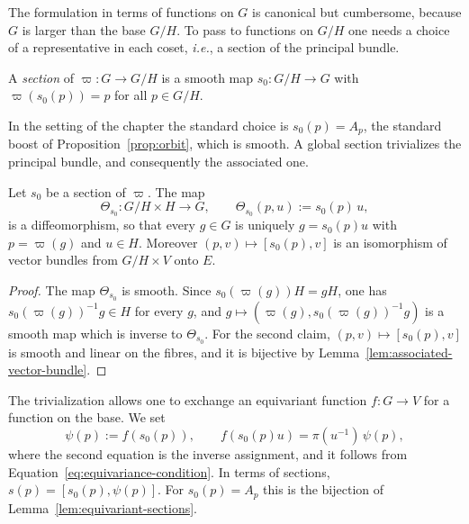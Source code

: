 	The formulation in terms of functions on $G$ is canonical but cumbersome, because $G$ is larger than the base $G/H$. To pass to functions on $G/H$ one needs a choice of a representative in each coset, \textit{i.e.}, a section of the principal bundle.
	
	\begin{definition}\label{def:section-principal}
		A \emph{section} of $\varpi:G\to G/H$ is a smooth map $s_0:G/H\to G$ with $\varpi(s_0(p))=p$ for all $p\in G/H$.
	\end{definition}
	
	In the setting of the chapter the standard choice is $s_0(p)=A_p$, the standard boost of Proposition~\ref{prop:orbit}, which is smooth. A global section trivializes the principal bundle, and consequently the associated one.
	
	\begin{lemma}\label{lem:trivialization}
		Let $s_0$ be a section of $\varpi$. The map
		\begin{equation}\label{eq:trivialization}
			\Theta_{s_0}:G/H\times H\to G,\qquad \Theta_{s_0}(p,u):=s_0(p)\,u,
		\end{equation}
		is a diffeomorphism, so that every $g\in G$ is uniquely $g=s_0(p)u$ with $p=\varpi(g)$ and $u\in H$. Moreover $(p,v)\mapsto[s_0(p),v]$ is an isomorphism of vector bundles from $G/H\times V$ onto $E$.
	\end{lemma}
	
	\begin{proof}
		The map $\Theta_{s_0}$ is smooth. Since $s_0(\varpi(g))H=gH$, one has $s_0(\varpi(g))^{-1}g\in H$ for every $g$, and $g\mapsto(\varpi(g),s_0(\varpi(g))^{-1}g)$ is a smooth map which is inverse to $\Theta_{s_0}$. For the second claim, $(p,v)\mapsto[s_0(p),v]$ is smooth and linear on the fibres, and it is bijective by Lemma~\ref{lem:associated-vector-bundle}.
	\end{proof}
	
	The trivialization allows one to exchange an equivariant function $f:G\to V$ for a function on the base. We set
	\begin{equation}\label{eq:psi-definition}
		\psi(p):=f(s_0(p)),\qquad f(s_0(p)u)=\pi(u^{-1})\,\psi(p),
	\end{equation}
	where the second equation is the inverse assignment, and it follows from Equation~\eqref{eq:equivariance-condition}. In terms of sections, $s(p)=[s_0(p),\psi(p)]$. For $s_0(p)=A_p$ this is the bijection of Lemma~\ref{lem:equivariant-sections}.
	
